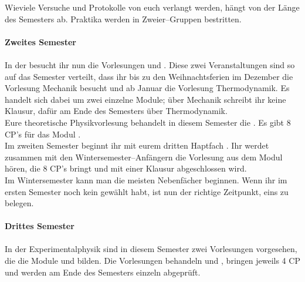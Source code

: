 Wieviele Versuche und Protokolle von euch verlangt werden, hängt von der Länge des Semesters ab.
Praktika werden in Zweier--Gruppen bestritten.
\\\\\hspace*{\fill}\textbf{Zweites Semester}\hspace*{\fill}\\\\
In der  besucht ihr nun die Vorlesungen   und  . Diese zwei Veranstaltungen sind so auf das Semester verteilt, dass ihr bis zu den Weihnachtsferien im Dezember die Vorlesung Mechanik besucht und ab Januar die Vorlesung Thermodynamik. Es handelt sich dabei um zwei einzelne Module; über Mechanik schreibt ihr keine Klausur, dafür am Ende des Semesters über Thermodynamik.\\
Eure theoretische Physikvorlesung behandelt in diesem Semester die . Es gibt 8 CP's für das Modul .\\
Im zweiten Semester beginnt ihr mit eurem dritten Haptfach . Ihr werdet zusammen mit den Wintersemester--Anfängern die Vorlesung  aus dem Modul  hören, die 8 CP's bringt und mit einer Klausur abgeschlossen wird.\\
Im Wintersemester kann man die meisten Nebenfächer beginnen. Wenn ihr im ersten Semester noch kein  gewählt habt, ist nun der richtige Zeitpunkt, eins zu belegen.
\\\\\hspace*{\fill}\textbf{Drittes Semester}\hspace*{\fill}\\\\
In der Experimentalphysik sind in diesem Semester zwei Vorlesungen vorgesehen, die die Module  und  bilden. Die Vorlesungen behandeln  und , bringen jeweils 4 CP und werden am Ende des Semesters einzeln abgeprüft.\\
